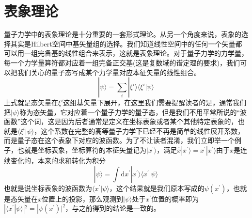 \documentclass[12pt,a4paper,openany,twoside]{book}
\numberwithin{equation}{section}
\begin{document}
  \section{表象理论}
  量子力学中的表象理论是十分重要的一套形式理论。从另一个角度来说，表象的选择其实是Hilbert空间中基矢量组的选择。我们知道线性空间中的任何一个矢量都可以用一组完备基的线性组合来表示，这就是表象理论。对于量子力学的力学量，每一个力学量算符都对应着一组完备正交基(这是复数域的谱定理的要求)，我们可以把我们关心的量子态写成某个力学量对应本征矢量的线性组合。
  \begin{equation}
    | \psi \rangle=\sum_{i} | \xi^{i} \rangle\langle\xi^{i} | \psi\rangle
  \end{equation}
  上式就是态矢量在$\xi^{i}$这组基矢量下展开，在这里我们需要提醒读者的是，通常我们把$| \psi \rangle$称为态矢量，它对应着一个量子力学的量子态，但是我们不用平常所说的“波函数”这个词，这是因为后者通常是定义在坐标表象或者某个其他特定表象的，也就是$\langle\xi^{i} | \psi\rangle$，这个系数在完整的高等量子力学下已经不再是简单的线性展开系数，而是量子态在这个表象下对应的波函数。为了不让读者混淆，我们立即举一个例子，也就是坐标表象，坐标算符的本征矢量记为$|x^{\prime}\rangle$，满足$\hat{x}|x^{\prime}\rangle=x^{\prime}|x^{\prime}\rangle$由于$x$是连续变化的，本来的求和转化为积分
  \begin{equation}
    | \psi \rangle=\int \mathrm{d}x^{\prime} | x^{\prime} \rangle\langle x^{\prime} | \psi\rangle
  \end{equation}
  也就是说坐标表象的波函数为$\langle x^{\prime} | \psi\rangle$，这个结果就是我们原本写成的$\psi(x^{\prime})$，也就是态矢量在$x$位置上的投影，那么观测到$ | \psi \rangle $处于$x^{\prime}$位置的概率即为$|\langle x^{\prime} | \psi\rangle|^2 = |\psi(x^{\prime})|^2$，与之前得到的结论是一致的。
  
\end{document}
